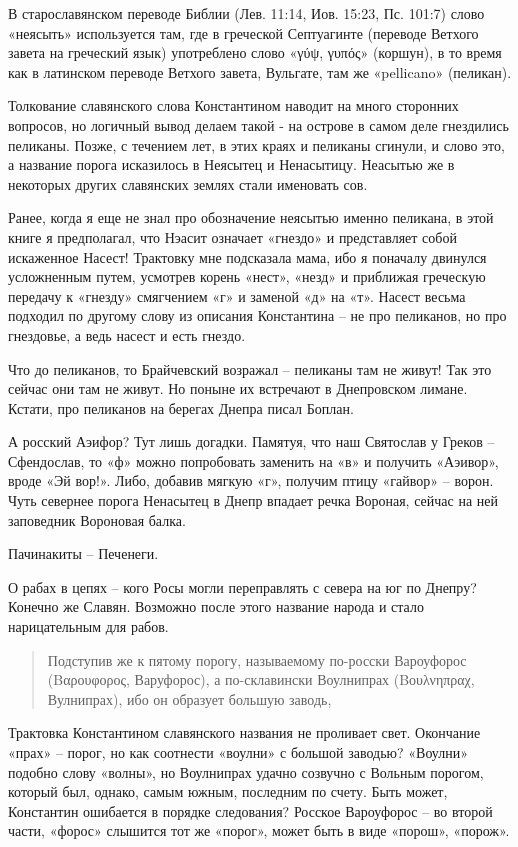 В старославянском переводе Библии (Лев. 11:14, Иов. 15:23, Пс. 101:7) слово «неясыть» используется там, где в греческой Септуагинте (переводе Ветхого завета на греческий язык) употреблено слово «γύψ, γυπός» (коршун), в то время как в латинском переводе Ветхого завета, Вульгате, там же «pellicano» (пеликан). 

Толкование славянского слова Константином наводит на много сторонних вопросов, но логичный вывод делаем такой - на острове в самом деле гнездились пеликаны. Позже, с течением лет, в этих краях и пеликаны сгинули, и слово это, а название порога исказилось в Неясытец и Ненасытицу. Неасытью же в некоторых других славянских землях стали именовать сов.

Ранее, когда я еще не знал про обозначение неясытью именно пеликана, в этой книге я предполагал, что Нэасит означает «гнездо» и представляет собой искаженное Насест! Трактовку мне подсказала мама, ибо я поначалу двинулся усложненным путем, усмотрев корень «нест», «незд» и приближая греческую передачу к «гнезду» смягчением «г» и заменой «д» на «т». Насест весьма подходил по другому слову из описания Константина – не про пеликанов, но про гнездовье, а ведь насест и есть гнездо.

Что до пеликанов, то Брайчевский возражал – пеликаны там не живут! Так это сейчас они там не живут. Но поныне их встречают в Днепровском лимане. Кстати, про пеликанов на берегах Днепра писал Боплан.

А росский Аэифор? Тут лишь догадки. Памятуя, что наш Святослав у Греков – Сфендослав, то «ф» можно попробовать заменить на «в» и получить «Аэивор», вроде «Эй вор!». Либо, добавив мягкую «г», получим птицу «гайвор» – ворон. Чуть севернее порога Ненасытец в Днепр впадает речка Вороная, сейчас на ней заповедник Вороновая балка. 

Пачинакиты – Печенеги.

О рабах в цепях – кого Росы могли переправлять с севера на юг по Днепру? Конечно же Славян. Возможно после этого название народа и стало нарицательным для рабов.

\begin{quotation}
Подступив же к пятому порогу, называемому по-росски Вароуфорос (Βαρουφορος, Варуфорос), а по-склавински Воулнипрах (Βουλνηπραχ, Вулнипрах), ибо он образует большую заводь, 
\end{quotation}

Трактовка Константином славянского названия не проливает свет. Окончание «прах» – порог, но как соотнести «воулни» с большой заводью? «Воулни» подобно слову «волны», но Воулнипрах удачно созвучно с Вольным порогом, который был, однако, самым южным, последним по счету. Быть может, Константин ошибается в порядке следования? Росское Вароуфорос – во второй части, «форос» слышится тот же «порог», может быть в виде «порош», «порож».

